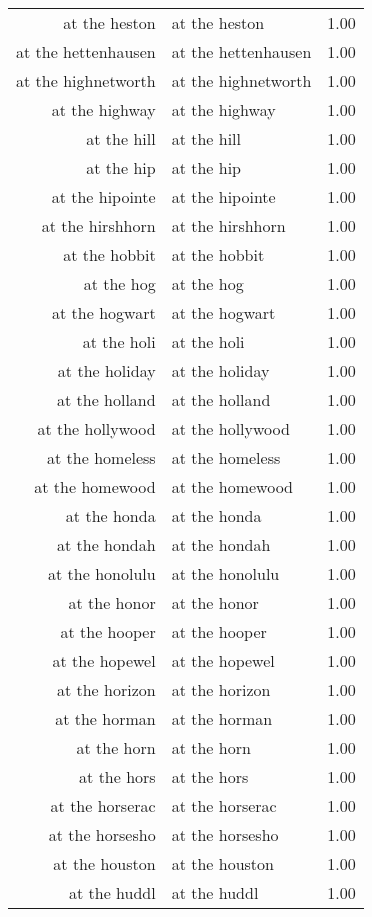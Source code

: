 \begin{table}[ht]
\begin{tabular}{rlr}
  at the heston & at the heston & 1.00 \\ 
  at the hettenhausen & at the hettenhausen & 1.00 \\ 
  at the highnetworth & at the highnetworth & 1.00 \\ 
  at the highway & at the highway & 1.00 \\ 
  at the hill & at the hill & 1.00 \\ 
  at the hip & at the hip & 1.00 \\ 
  at the hipointe & at the hipointe & 1.00 \\ 
  at the hirshhorn & at the hirshhorn & 1.00 \\ 
  at the hobbit & at the hobbit & 1.00 \\ 
  at the hog & at the hog & 1.00 \\ 
  at the hogwart & at the hogwart & 1.00 \\ 
  at the holi & at the holi & 1.00 \\ 
  at the holiday & at the holiday & 1.00 \\ 
  at the holland & at the holland & 1.00 \\ 
  at the hollywood & at the hollywood & 1.00 \\ 
  at the homeless & at the homeless & 1.00 \\ 
  at the homewood & at the homewood & 1.00 \\ 
  at the honda & at the honda & 1.00 \\ 
  at the hondah & at the hondah & 1.00 \\ 
  at the honolulu & at the honolulu & 1.00 \\ 
  at the honor & at the honor & 1.00 \\ 
  at the hooper & at the hooper & 1.00 \\ 
  at the hopewel & at the hopewel & 1.00 \\ 
  at the horizon & at the horizon & 1.00 \\ 
  at the horman & at the horman & 1.00 \\ 
  at the horn & at the horn & 1.00 \\ 
  at the hors & at the hors & 1.00 \\ 
  at the horserac & at the horserac & 1.00 \\ 
  at the horsesho & at the horsesho & 1.00 \\ 
  at the houston & at the houston & 1.00 \\ 
  at the huddl & at the huddl & 1.00 \\ 

\end{tabular}
\end{table}
